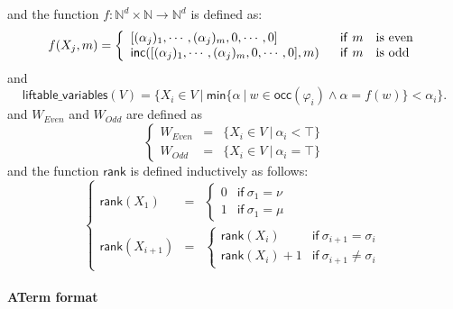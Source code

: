 \documentclass{article}
\begin{document}
and the function $f:\mathbb{N}^{d}\times \mathbb{N}\rightarrow \mathbb{N}%
^{d} $ is defined as:%
\begin{equation*}
f(X_{j},m)=\left\{ 
\begin{array}{ll}
\lbrack (\mathcal{\alpha }_{j})_{1},\cdots ,(\mathcal{\alpha }%
_{j})_{m},0,\cdots ,0] & \text{\textsf{if}}\ m\text{ is even} \\ 
\mathsf{inc}([(\mathcal{\alpha }_{j})_{1},\cdots ,(\mathcal{\alpha }%
_{j})_{m},0,\cdots ,0],m) & \text{\textsf{if}}\ m\text{ is odd}%
\end{array}%
\right.
\end{equation*}%
and%
\begin{equation*}
\mathsf{liftable\_variables}(V)=\{X_{i}\in V\ |\ \mathsf{min}\{\alpha \ |\
w\in \mathsf{\mathsf{occ}}(\varphi _{i})\wedge \alpha =f(w)\}\mathsf{<}%
\mathcal{\alpha }_{i}\}.
\end{equation*}%
and $W_{Even}$ and $W_{Odd}$ are defined as%
\begin{equation*}
\left\{ 
\begin{array}{lll}
W_{Even} & = & \{X_{i}\in V\ |\ \mathcal{\alpha }_{i}<\top \} \\ 
W_{Odd} & = & \{X_{i}\in V\ |\ \mathcal{\alpha }_{i}=\top \}%
\end{array}%
\right.
\end{equation*}%
and the function $\mathsf{rank}$ is defined inductively as follows:%
\begin{equation*}
\left\{ 
\begin{array}{lll}
\mathsf{rank}(X_{1}) & = & \left\{ 
\begin{array}{ll}
0 & \mathsf{if}\ \sigma _{1}=\nu \\ 
1 & \mathsf{if}\ \sigma _{1}=\mu%
\end{array}%
\right. \\ 
\mathsf{rank}(X_{i+1}) & = & \left\{ 
\begin{array}{ll}
\mathsf{rank}(X_{i}) & \mathsf{if}\ \sigma _{i+1}=\sigma _{i} \\ 
\mathsf{rank}(X_{i})+1 & \mathsf{if}\ \sigma _{i+1}\neq \sigma _{i}%
\end{array}%
\right.%
\end{array}%
\right.
\end{equation*}

\newpage

\appendix

\paragraph{ATerm format}
\end{document}

